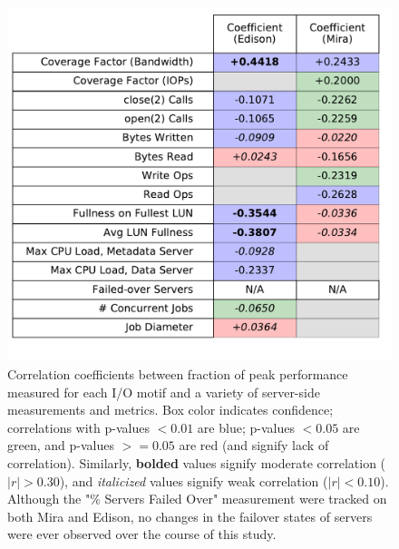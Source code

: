 \begin{figure}[t]
    \centering
    \includegraphics[width=\columnwidth]{figs/correlation_table.pdf}
    \caption{Correlation coefficients between fraction of peak performance measured for each I/O motif and a variety of server-side measurements and metrics.
    Box color indicates confidence; correlations with p-values $< 0.01$ are blue; p-values $< 0.05$ are green, and p-values $>= 0.05$ are red (and signify lack of correlation).
    Similarly, \textbf{bolded} values signify moderate correlation ($|r| > 0.30$), and \textit{italicized} values signify weak correlation ($|r| < 0.10$).
    Although the "\% Servers Failed Over" measurement were tracked on both Mira and Edison, no changes in the failover states of servers were ever observed over the course of this study.
    }
    \label{fig:correlation-table}
\vspace{-.2in}
\end{figure}

